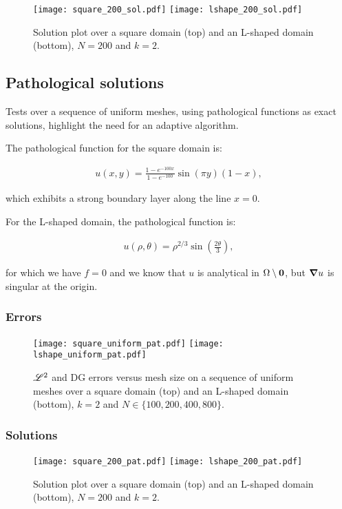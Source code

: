 \begin{figure}[!ht]
	\centering
	\texttt{[image: square\_200\_sol.pdf]}
    \texttt{[image: lshape\_200\_sol.pdf]}
	\caption{Solution plot over a square domain (top) and an L-shaped domain (bottom), $N = 200$ and $k = 2$.}
\end{figure}

\newpage
\subsection{Pathological solutions}

Tests over a sequence of uniform meshes, using pathological functions as exact solutions, highlight the need for an adaptive algorithm.

\cite{Antonietti2013} The pathological function for the square domain is:

\begin{gather}
    u(x, y) = \frac{1 - e^{-100x}}{1 - e^{-100}} \sin(\pi y) (1 - x),
\end{gather}

which exhibits a strong boundary layer along the line $x = 0$.

For the L-shaped domain, the pathological function is:

\begin{gather}
    u(\rho, \theta) = \rho^{2 / 3} \sin\left(\frac{2 \theta}{3}\right),
\end{gather}

for which we have $f = 0$ and we know that $u$ is analytical in $\Omega \setminus \bm{0}$, but $\bm{\nabla}{u}$ is singular at the origin.

\newpage
\subsubsection{Errors}

\begin{figure}[!ht]
	\centering
	\texttt{[image: square\_uniform\_pat.pdf]}
    \texttt{[image: lshape\_uniform\_pat.pdf]}
	\caption{$\mathscr{L}^2$ and DG errors versus mesh size on a sequence of uniform meshes over a square domain (top) and an L-shaped domain (bottom), $k = 2$ and $N \in \{100, 200, 400, 800\}$.}
\end{figure}

\newpage
\subsubsection{Solutions}

\begin{figure}[!ht]
	\centering
	\texttt{[image: square\_200\_pat.pdf]}
    \texttt{[image: lshape\_200\_pat.pdf]}
	\caption{Solution plot over a square domain (top) and an L-shaped domain (bottom), $N = 200$ and $k = 2$.}
\end{figure}